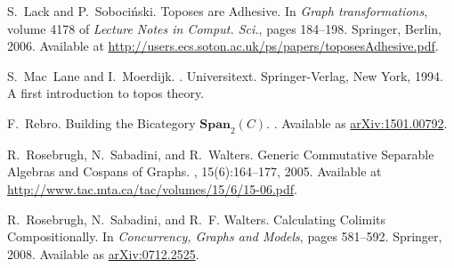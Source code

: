\documentclass{tac}
\begin{document}
\begin{references*}
	S.~Lack and P.~Soboci{\'n}ski.
	\newblock Toposes are {A}dhesive.
	\newblock In {\em Graph transformations}, volume 4178 of {\em Lecture Notes in
		Comput. Sci.}, pages 184--198. Springer, Berlin, 2006.
	\newblock Available at
	{\href{http://users.ecs.soton.ac.uk/ps/papers/toposesAdhesive.pdf}{http://users.ecs.soton.ac.uk/ps/papers/toposesAdhesive.pdf}}.
	
	S.~Mac~Lane and I.~Moerdijk.
	.
	\newblock Universitext. Springer-Verlag, New York, 1994.
	\newblock A first introduction to topos theory.
	
	F.~Rebro.
	\newblock Building the {B}icategory {$\textbf{Span}_2 (C)$}.
	.
	\newblock Available as
	\href{https://arxiv.org/abs/1501.00792}{arXiv:1501.00792}.
	
	R.~Rosebrugh, N.~Sabadini, and R.~Walters.
	\newblock Generic {C}ommutative {S}eparable {A}lgebras and {C}ospans of
	{G}raphs.
	, 15(6):164--177, 2005.
	\newblock Available at
	\href{http://www.tac.mta.ca/tac/volumes/15/6/15-06.pdf}{http://www.tac.mta.ca/tac/volumes/15/6/15-06.pdf}.
	
	R.~Rosebrugh, N.~Sabadini, and R.~F. Walters.
	\newblock Calculating {C}olimits {C}ompositionally.
	\newblock In {\em Concurrency, Graphs and Models}, pages 581--592. Springer,
	2008.
	\newblock Available as \href{https://arxiv.org/abs/0712.2525}{arXiv:0712.2525}.
\end{references*}

%
%
\end{document}
